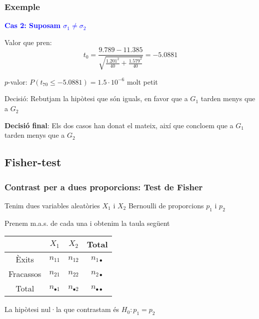 \documentclass[12pt,t]{beamer}
\newcommand{\blue}[1]{\textcolor{blue}{#1}}
\renewcommand{\emph}[1]{{\color{red}#1}}
\renewcommand{\leq}{\leqslant}
\theoremstyle{plain}
\theoremstyle{definition}
\begin{document}
\begin{frame}
\frametitle{Exemple}
\vspace*{-2ex}

\textbf{\blue{Cas 2: Suposam $\sigma_1\neq \sigma_2$}}
\medskip

\emph{Valor que pren}: 
$$
t_0=\frac{9.789-11.385}{\sqrt{\frac{1.201^2}{40}+\frac{1.579^2}{40}}}=-5.0881
$$
\medskip

\emph{$p$-valor}: 
$P(t_{70}\leq-5.0881)=1.5\cdot 10^{-6}$ molt petit
\medskip

\emph{Decisió}: Rebutjam la hipòtesi que són iguals, en favor que a $G_1$ tarden menys que a $G_2$
\pause\bigskip 

\emph{\bf Decisió final}: Els dos casos han donat el mateix, així que concloem que a $G_1$ tarden menys que a $G_2$


\end{frame}



\subsection{Fisher-test}

\begin{frame}
\frametitle{Contrast per a dues proporcions: Test de Fisher}

Tenim dues variables aleatòries $X_1$ i $X_2$ Bernoulli de proporcions  $p_1$ i $p_2$
\medskip

Prenem m.a.s. de cada una i obtenim la taula següent
\begin{center}
\begin{tabular}{c|cc|c|}
  & $X_1$ & $X_2$ &  Total\\\hline
Èxits & $n_{11}$ & $n_{12}$ &  $n_{1\bullet}$\\
Fracassos & $n_{21}$ & $n_{22}$ &  $n_{2\bullet}$ \\\hline 
Total & $n_{\bullet1}$ & $n_{\bullet2}$ & $n_{\bullet\bullet}$
\\\hline
\end{tabular}
\end{center}
\medskip

La hipòtesi nul·la que contrastam és $H_0: p_1=p_2$




\end{frame}
\end{document}
